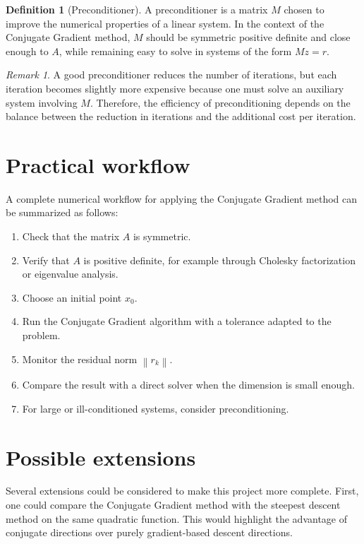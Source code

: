 \documentclass[11pt,a4paper]{report}
\theoremstyle{definition}
\newtheorem{definition}{Definition}[chapter]
\theoremstyle{plain}
\theoremstyle{remark}
\newtheorem{remark}{Remark}[chapter]
\newcommand{\norm}[1]{\left\lVert #1 \right\rVert}
\begin{document}
\begin{definition}[Preconditioner]
A preconditioner is a matrix $M$ chosen to improve the numerical properties of a linear system. In the context of the Conjugate Gradient method, $M$ should be symmetric positive definite and close enough to $A$, while remaining easy to solve in systems of the form $Mz=r$.
\end{definition}

\begin{remark}
A good preconditioner reduces the number of iterations, but each iteration becomes slightly more expensive because one must solve an auxiliary system involving $M$. Therefore, the efficiency of preconditioning depends on the balance between the reduction in iterations and the additional cost per iteration.
\end{remark}

\section{Practical workflow}

A complete numerical workflow for applying the Conjugate Gradient method can be summarized as follows:

\begin{enumerate}
    \item Check that the matrix $A$ is symmetric.
    \item Verify that $A$ is positive definite, for example through Cholesky factorization or eigenvalue analysis.
    \item Choose an initial point $x_0$.
    \item Run the Conjugate Gradient algorithm with a tolerance adapted to the problem.
    \item Monitor the residual norm $\norm{r_k}$.
    \item Compare the result with a direct solver when the dimension is small enough.
    \item For large or ill-conditioned systems, consider preconditioning.
\end{enumerate}

\section{Possible extensions}

Several extensions could be considered to make this project more complete. First, one could compare the Conjugate Gradient method with the steepest descent method on the same quadratic function. This would highlight the advantage of conjugate directions over purely gradient-based descent directions.
\end{document}
